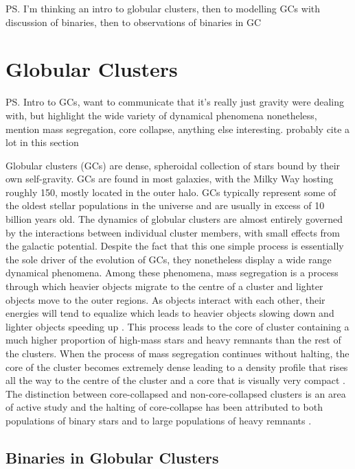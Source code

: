 \ps{I'm thinking an intro to globular clusters, then to modelling GCs with discussion of binaries,
	then to observations of binaries in GC}

\section{Globular Clusters}

\ps{Intro to GCs, want to communicate that it's really just gravity were dealing with, but highlight
	the wide variety of dynamical phenomena nonetheless, mention mass segregation, core collapse,
	anything else interesting. probably cite \citet{Heggie2003} a lot in this section}

Globular clusters (GCs) are dense, spheroidal collection of stars bound by their own self-gravity.
GCs are found in most galaxies, with the Milky Way hosting roughly 150, mostly located in the outer
halo. GCs typically represent some of the oldest stellar populations in the universe and are usually
in excess of 10 billion years old. The dynamics of globular clusters are almost entirely governed by
the interactions between individual cluster members, with small effects from the galactic potential.
Despite the fact that this one simple process is essentially the sole driver of the evolution of
GCs, they nonetheless display a wide range dynamical phenomena. Among these phenomena, mass
segregation is a process through which heavier objects migrate to the centre of a cluster and
lighter objects move to the outer regions. As objects interact with each other, their energies will
tend to equalize which leads to heavier objects slowing down and lighter objects speeding up
\citep{Heggie2003}. This process leads to the core of cluster containing a much higher proportion of
high-mass stars and heavy remnants than the rest of the clusters. When the process of mass
segregation continues without halting, the core of the cluster becomes extremely dense leading to a
density profile that rises all the way to the centre of the cluster and a core that is visually very
compact \citep{Heggie2003}. The distinction between core-collapsed and non-core-collapsed clusters
is an area of active study and the halting of core-collapse has been attributed to both populations
of binary stars \citep{Chatterjee2013} and to large populations of heavy remnants
\citep{Kremer2019}.

\subsection{Binaries in Globular Clusters}

